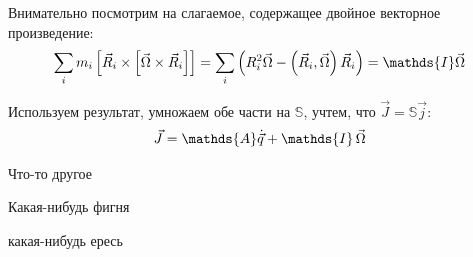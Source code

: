 \documentclass[12pt]{article}
\newcommand{\bbA}{\mathds{A}}
\newcommand{\bbI}{\mathds{I}}
\newcommand{\bbS}{\mathds{S}}
\newcommand{\lb}{\left(}
\newcommand{\rb}{\right)}
\begin{document}
Внимательно посмотрим на слагаемое, содержащее двойное векторное произведение:
\begin{gather}
\sum_i m_i \left[ \vec{R}_i \times \left[ \vec{\Omega} \times \vec{R}_i \right] \right] = \sum_i \lb R_i^2 \vec{\Omega} - \lb \vec{R}_i , \vec{\Omega} \rb \vec{R}_i \rb = \bbI \vec{\Omega} \notag
\end{gather}

Используем результат, умножаем обе части на $\bbS$, учтем, что $\vec{J} = \bbS \vec{j}$: 
\begin{gather}
\vec{J} = \bbA \dot{\vec{q}} + \bbI \, \vec{\Omega} \notag 
\end{gather}

Что-то другое

Какая-нибудь фигня

какая-нибудь ересь
\end{document}
